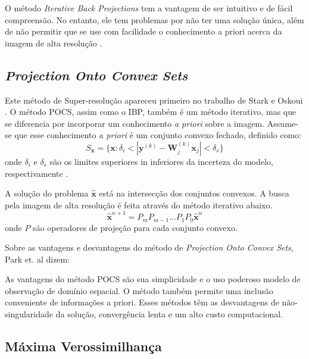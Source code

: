 O método \emph{Iterative Back Projections} tem a vantagem de ser intuitivo e de fácil compreensão.
No entanto, ele tem problemas por não ter uma solução única, além de não permitir que se use com facilidade o conhecimento a priori acerca da imagem de alta resolução \cite{nasrollahi2014super, park2003super}.

\subsection{\emph{Projection Onto Convex Sets}}
Este método de Super-resolução apareceu primeiro no trabalho de Stark e Oskoui \cite{stark1989high}.
O método POCS, assim como o IBP, também é um método iterativo, mas que se diferencia por incorporar um conhecimento \emph{a priori} sobre a imagem. Assume-se que esse conhecimento \emph{a priori} é um conjunto convexo fechado, definido como:
\begin{equation}
	S_{\mathbf{x}} = \{ \mathbf{x} : \delta_i < |\mathbf{y}^{(k)}-\mathbf{W}^{(k)}_j \mathbf{x}_j| < \delta_s \}
\end{equation}
onde $\delta_i$ e $\delta_s$ são os limites superiores in inferiores da incerteza do modelo, respectivamente \cite{nasrollahi2014super}.

A solução do problema $\hat{\mathbf{x}}$ está na intersecção dos conjuntos convexos. A busca pela imagem de alta resolução é feita através do método iterativo abaixo\cite{reis2014metodo}.
\begin{equation}
	\hat{\mathbf{x}}^{n+1} = P_m P_{m-1} ... P_1 P_0 \hat{\mathbf{x}}^{n}
\end{equation}
onde $P$ são operadores de projeção para cada conjunto convexo.

Sobre as vantagens e desvantagens do método de \emph{Projection Onto Convex Sets}, Park et. al dizem:

\begin{citacao}
As vantagens do método POCS são sua simplicidade e o uso poderoso modelo de observação de domínio espacial. O método também permite uma inclusão conveniente de informações a priori. Esses métodos têm as desvantagens de não-singularidade da solução, convergência lenta e um alto custo computacional. \cite{park2003super}
\end{citacao}

\subsection{Máxima Verossimilhança}
\label{sec:metodosprob}

